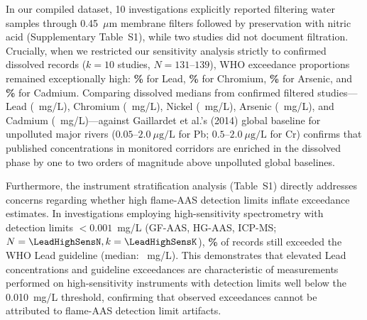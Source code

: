 \documentclass[authoryear,preprint,12pt]{elsarticle}
\begin{document}
In our compiled dataset, 10 investigations explicitly reported filtering water samples through 0.45~$\mu\text{m}$ membrane filters followed by preservation with nitric acid (Supplementary Table~S1), while two studies did not document filtration. Crucially, when we restricted our sensitivity analysis strictly to confirmed dissolved records ($k=10$ studies, $N=131$--$139$), WHO exceedance proportions remained exceptionally high: \textbf{\LeadConfirmedDissolvedWhoPct\%} for Lead, \textbf{\ChromiumConfirmedDissolvedWhoPct\%} for Chromium, \textbf{\ArsenicConfirmedDissolvedWhoPct\%} for Arsenic, and \textbf{\CadmiumConfirmedDissolvedWhoPct\%} for Cadmium. Comparing dissolved medians from confirmed filtered studies—Lead (\LeadConfirmedDissolvedMedian~mg/L), Chromium (\ChromiumConfirmedDissolvedMedian~mg/L), Nickel (\NickelConfirmedDissolvedMedian~mg/L), Arsenic (\ArsenicConfirmedDissolvedMedian~mg/L), and Cadmium (\CadmiumConfirmedDissolvedMedian~mg/L)—against Gaillardet et al.'s (2014) global baseline for unpolluted major rivers ($0.05\text{--}2.0~\mu\text{g/L}$ for Pb; $0.5\text{--}2.0~\mu\text{g/L}$ for Cr) confirms that published concentrations in monitored corridors are enriched in the dissolved phase by one to two orders of magnitude above unpolluted global baselines.

Furthermore, the instrument stratification analysis (Table~S1) directly addresses concerns regarding whether high flame-AAS detection limits inflate exceedance estimates. In investigations employing high-sensitivity spectrometry with detection limits $<0.001$~mg/L (GF-AAS, HG-AAS, ICP-MS; $N=\LeadHighSensN, k=\LeadHighSensK$), \textbf{\LeadHighSensExceedPct\%} of records still exceeded the WHO Lead guideline (median: \LeadHighSensMedian~mg/L). This demonstrates that elevated Lead concentrations and guideline exceedances are characteristic of measurements performed on high-sensitivity instruments with detection limits well below the 0.010~mg/L threshold, confirming that observed exceedances cannot be attributed to flame-AAS detection limit artifacts.
\end{document}
